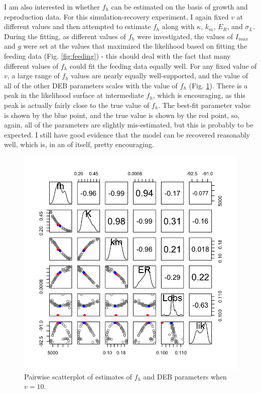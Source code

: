 \documentclass[12pt,reqno,final,pdftex]{amsart}\usepackage[]{graphicx}\usepackage[]{color}
\newenvironment{knitrout}{}{} %
\theoremstyle{plain}
\numberwithin{equation}{part}
\begin{document}
I am also interested in whether $f_h$ can be estimated on the basis of growth and reproduction data.
For this simulation-recovery experiment, I again fixed $v$ at different values and then attempted to estimate $f_h$ along with $\kappa$, $k_m$, $E_R$, and $\sigma_L$.
During the fitting, as different values of $f_h$ were investigated, the values of $I_{max}$ and $g$ were set at the values that maximized the likelihood based on fitting the feeding data (Fig. \ref{fig:feeding}) - this should deal with the fact that many different values of $f_h$ could fit the feeding data equally well.
For any fixed value of $v$, a large range of $f_h$ values are nearly equally well-supported, and the value of all of the other DEB parameters scales with the value of $f_h$ (Fig. \ref{fig:dyn-food-pairwise}).
There is a peak in the likelihood surface at intermediate $f_h$, which is encouraging, as this peak is actually fairly close to the true value of $f_h$.
The best-fit parameter value is shown by the blue point, and the true value is shown by the red point, so, again, all of the parameters are slightly mis-estimated, but this is probably to be expected.
I still have good evidence that the model can be recovered reasonably well, which is, in an of itself, pretty encouraging.

\begin{knitrout}\scriptsize
{}\color{fgcolor}\begin{figure}

\includegraphics[width=\linewidth]{figure/dyn-food-pairwise-1} \hfill{}

\caption[Pairwise scatterplot of estimates of ]{Pairwise scatterplot of estimates of $f_h$ and DEB parameters when $v=10$.}\label{fig:dyn-food-pairwise}
\end{figure}


\end{knitrout}
\end{document}

